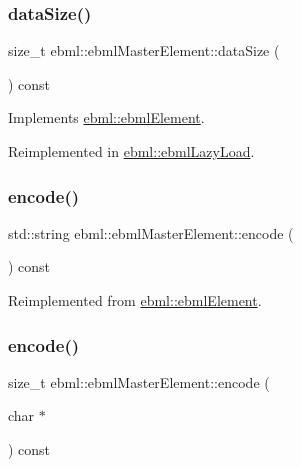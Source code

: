 \subsubsection{\texorpdfstring{data\+Size()}{dataSize()}}
{\footnotesize\ttfamily size\+\_\+t ebml\+::ebml\+Master\+Element\+::data\+Size (\begin{DoxyParamCaption}{ }\end{DoxyParamCaption}) const\hspace{0.3cm}{\ttfamily [virtual]}}



Implements \mbox{\hyperlink{classebml_1_1ebmlElement_a47ed4167d9c69104e02b6dbad0cd1fef}{ebml\+::ebml\+Element}}.



Reimplemented in \mbox{\hyperlink{classebml_1_1ebmlLazyLoad_a0a6ad37b1a5db83be3833d28e933ebc7}{ebml\+::ebml\+Lazy\+Load}}.

\mbox{\label{classebml_1_1ebmlMasterElement_a2016b30a9ac7d48e990a6a864138a362}} 
\subsubsection{\texorpdfstring{encode()}{encode()}\hspace{0.1cm}{\footnotesize\ttfamily [1/3]}}
{\footnotesize\ttfamily std\+::string ebml\+::ebml\+Master\+Element\+::encode (\begin{DoxyParamCaption}{ }\end{DoxyParamCaption}) const\hspace{0.3cm}{\ttfamily [virtual]}}



Reimplemented from \mbox{\hyperlink{classebml_1_1ebmlElement_aaeddd5ffc1da2f3d4f2a9c9ec1dbed4d}{ebml\+::ebml\+Element}}.

\mbox{\label{classebml_1_1ebmlMasterElement_ac0bc9d595746939fea3e30b810d89c9f}} 
\subsubsection{\texorpdfstring{encode()}{encode()}\hspace{0.1cm}{\footnotesize\ttfamily [2/3]}}
{\footnotesize\ttfamily size\+\_\+t ebml\+::ebml\+Master\+Element\+::encode (\begin{DoxyParamCaption}\item[{char $\ast$}]{ }\end{DoxyParamCaption}) const\hspace{0.3cm}{\ttfamily [virtual]}}



